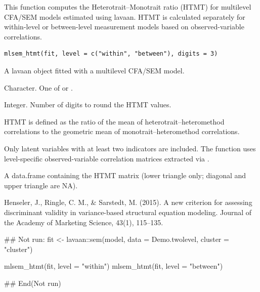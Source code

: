 \documentclass[a4paper]{book}
\begin{document}
%
\begin{Description}
This function computes the Heterotrait–Monotrait ratio (HTMT)
for multilevel CFA/SEM models estimated using lavaan.
HTMT is calculated separately for within-level or between-level
measurement models based on observed-variable correlations.
\end{Description}
%
\begin{Usage}
\begin{verbatim}
mlsem_htmt(fit, level = c("within", "between"), digits = 3)
\end{verbatim}
\end{Usage}
%
\begin{Arguments}
\begin{ldescription}
\item[\code{fit}] A lavaan object fitted with a multilevel CFA/SEM model.

\item[\code{level}] Character. One of  or .

\item[\code{digits}] Integer. Number of digits to round the HTMT values.
\end{ldescription}
\end{Arguments}
%
\begin{Details}
HTMT is defined as the ratio of the mean of heterotrait–heteromethod
correlations to the geometric mean of monotrait–heteromethod
correlations.

Only latent variables with at least two indicators are included.
The function uses level-specific observed-variable correlation
matrices extracted via .
\end{Details}
%
\begin{Value}
A data.frame containing the HTMT matrix
(lower triangle only; diagonal and upper triangle are NA).
\end{Value}
%
\begin{References}
Henseler, J., Ringle, C. M., \& Sarstedt, M. (2015).
A new criterion for assessing discriminant validity in
variance-based structural equation modeling.
Journal of the Academy of Marketing Science, 43(1), 115–135.
\end{References}
%
\begin{Examples}
\begin{ExampleCode}
\#\# Not run: 
fit <- lavaan::sem(model, data = Demo.twolevel, cluster = "cluster")

mlsem_htmt(fit, level = "within")
mlsem_htmt(fit, level = "between")

## End(Not run)
\end{ExampleCode}
\end{Examples}
\end{document}
